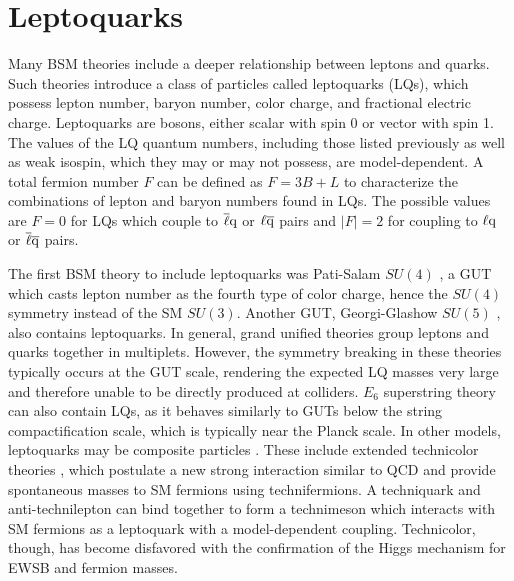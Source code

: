 \section{Leptoquarks}

Many BSM theories include a deeper relationship between leptons and quarks. Such theories introduce a class of particles called leptoquarks (LQs), which possess lepton number, baryon number, color charge, and fractional electric charge. Leptoquarks are bosons, either scalar with spin 0 or vector with spin 1. The values of the LQ quantum numbers, including those listed previously as well as weak isospin, which they may or may not possess, are model-dependent. A total fermion number $F$ can be defined as $F = 3B + L$ to characterize the combinations of lepton and baryon numbers found in LQs. The possible values are $F=0$ for LQs which couple to $\overline{\ell}\mathrm{q}$ or $\ell\overline{\mathrm{q}}$ pairs and $|F|=2$ for coupling to $\ell\mathrm{q}$ or $\overline{\ell}\overline{\mathrm{q}}$ pairs.

The first BSM theory to include leptoquarks was Pati-Salam $SU(4)$ \cite{SU4}, a GUT which casts lepton number as the fourth type of color charge, hence the $SU(4)$ symmetry instead of the SM $SU(3)$. Another GUT, Georgi-Glashow $SU(5)$ \cite{GUT}, also contains leptoquarks. In general, grand unified theories group leptons and quarks together in multiplets. However, the symmetry breaking in these theories typically occurs at the GUT scale, rendering the expected LQ masses very large and therefore unable to be directly produced at colliders. $E_6$ superstring theory \cite{SUPERSTR} can also contain LQs, as it behaves similarly to GUTs below the string compactification scale, which is typically near the Planck scale. In other models, leptoquarks may be composite particles \cite{LQ3b}. These include extended technicolor theories \cite{TC3}, which postulate a new strong interaction similar to QCD and provide spontaneous masses to SM fermions using technifermions. A techniquark and anti-technilepton can bind together to form a technimeson which interacts with SM fermions as a leptoquark with a model-dependent coupling. Technicolor, though, has become disfavored with the confirmation of the Higgs mechanism for EWSB and fermion masses.

